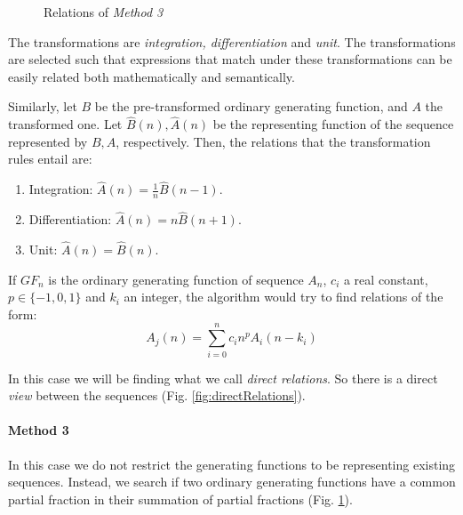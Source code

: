 \begin{figure}
\caption{Relations of \emph{Method 3}}\label{fig:transitiveRelations}
\end{figure}


The transformations are \emph{integration, differentiation} and \emph{unit}.
The transformations are selected such that expressions that match under these transformations can be easily related
both mathematically and semantically.

Similarly, let $B$ be the pre-transformed ordinary generating function, and $A$ the transformed one. Let $\hat{B}(n),
 \hat{A}(n)$ be the representing function of the sequence represented by $B,A$, respectively. Then, the relations
 that the transformation rules entail are:

\begin{enumerate}
\item Integration: $\hat{A}(n) = \frac{1}{n}\hat{B}(n-1)$.
\item Differentiation: $\hat{A}(n) = n\hat{B}(n+1)$.
\item Unit: $\hat{A}(n) = \hat{B}(n)$.
\end{enumerate}

If $GF_n$ is the ordinary generating function of sequence $A_n$, $c_i$ a real constant, $p \in \{-1,0,1\}$ and $k_i$
an integer, the algorithm would try to find relations of the form:
\begin{equation}
A_j(n) = \sum_{i=0}^{n} c_i n^p A_i(n-k_i)
\end{equation}

In this case we will be finding what we call \emph{direct relations}. So there is a direct \emph{view} between the
sequences (Fig. \ref{fig:directRelations}).


\paragraph{Method 3}

In this case we do not restrict the generating functions to be representing existing \oeis sequences. Instead, we
search if two ordinary generating functions have a common partial fraction in their summation of partial fractions
(Fig. \ref{fig:transitiveRelations}).


